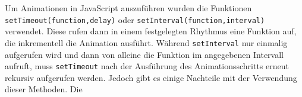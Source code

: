 


Um Animationen in JavaScript auszuführen wurden die Funktionen \verb+setTimeout(function,delay)+ oder \verb+setInterval(function,interval)+ verwendet. Diese rufen dann in einem festgelegten Rhythmus eine Funktion auf, die inkrementell die Animation ausführt. Während \verb+setInterval+ nur einmalig aufgerufen wird und dann von alleine die Funktion im angegebenen Intervall aufruft, muss \verb+setTimeout+ nach der Ausführung des Animationsschritts erneut rekursiv aufgerufen werden. Jedoch gibt es einige Nachteile mit der Verwendung dieser Methoden. Die 